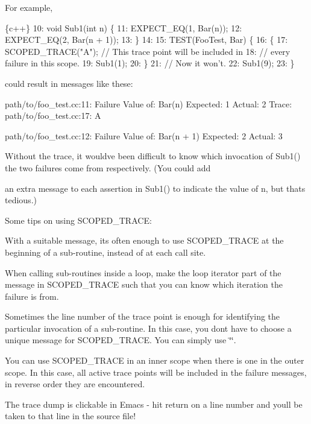 For example,


\begin{DoxyCode}
\{c++\}
10: void Sub1(int n) \{
11:   EXPECT\_EQ(1, Bar(n));
12:   EXPECT\_EQ(2, Bar(n + 1));
13: \}
14:
15: TEST(FooTest, Bar) \{
16:   \{
17:     SCOPED\_TRACE("A");  // This trace point will be included in
18:                         // every failure in this scope.
19:     Sub1(1);
20:   \}
21:   // Now it won't.
22:   Sub1(9);
23: \}
\end{DoxyCode}


could result in messages like these\+:


\begin{DoxyCode}
path/to/foo\_test.cc:11: Failure
Value of: Bar(n)
Expected: 1
  Actual: 2
   Trace:
path/to/foo\_test.cc:17: A

path/to/foo\_test.cc:12: Failure
Value of: Bar(n + 1)
Expected: 2
  Actual: 3
\end{DoxyCode}


Without the trace, it would\textquotesingle{}ve been difficult to know which invocation of {\ttfamily Sub1()} the two failures come from respectively. (You could add

an extra message to each assertion in {\ttfamily Sub1()} to indicate the value of {\ttfamily n}, but that\textquotesingle{}s tedious.)

Some tips on using {\ttfamily S\+C\+O\+P\+E\+D\+\_\+\+T\+R\+A\+CE}\+:


\begin{DoxyEnumerate}
\item With a suitable message, it\textquotesingle{}s often enough to use {\ttfamily S\+C\+O\+P\+E\+D\+\_\+\+T\+R\+A\+CE} at the beginning of a sub-\/routine, instead of at each call site.
\item When calling sub-\/routines inside a loop, make the loop iterator part of the message in {\ttfamily S\+C\+O\+P\+E\+D\+\_\+\+T\+R\+A\+CE} such that you can know which iteration the failure is from.
\item Sometimes the line number of the trace point is enough for identifying the particular invocation of a sub-\/routine. In this case, you don\textquotesingle{}t have to choose a unique message for {\ttfamily S\+C\+O\+P\+E\+D\+\_\+\+T\+R\+A\+CE}. You can simply use {\ttfamily \char`\"{}\char`\"{}}.
\item You can use {\ttfamily S\+C\+O\+P\+E\+D\+\_\+\+T\+R\+A\+CE} in an inner scope when there is one in the outer scope. In this case, all active trace points will be included in the failure messages, in reverse order they are encountered.
\item The trace dump is clickable in Emacs -\/ hit {\ttfamily return} on a line number and you\textquotesingle{}ll be taken to that line in the source file!
\end{DoxyEnumerate}

